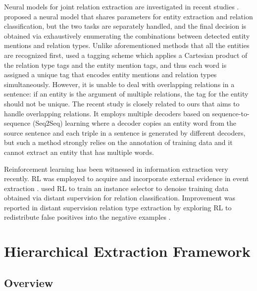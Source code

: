 \documentclass[letterpaper]{article} \usepackage{aaai19}  \usepackage{times}  \usepackage{helvet}  \usepackage{courier}  \usepackage{url}  \usepackage{graphicx}  \frenchspacing  \setlength{\pdfpagewidth}{8.5in}  \setlength{\pdfpageheight}{11in}  \usepackage{amsfonts}
\theoremstyle{definition}
\begin{document}
Neural models for joint relation extraction are investigated in recent studies \cite{katiyar2016investigating,zhang2017end}. \citeauthor{miwa2016end}  proposed a neural model that shares parameters for entity extraction and relation classification, but the two tasks are separately handled, and the final decision is obtained via exhaustively enumerating the combinations between detected entity mentions and relation types. Unlike aforementioned methods that all the entities are recognized first, \citeauthor{zheng2017joint}  used a tagging scheme which applies a Cartesian product of the relation type tags and the entity mention tags, and thus each word is assigned a unique tag that encodes entity mentions and relation types simultaneously. However, it is unable to deal with overlapping relations in a sentence: if an entity is the argument of multiple relations, the tag for the entity should not be unique.  
The recent study \cite{zeng2018extracting} is closely related to ours that aims to handle overlapping relations. It employs multiple decoders based on sequence-to-sequence (Seq2Seq) learning where a decoder copies an entity word from the source sentence and each triple in a sentence is generated by different decoders, but such a method strongly relies on the annotation of training data and it cannot extract an entity that has multiple words.

Reinforcement learning has been witnessed in information extraction very recently. RL was employed to acquire and incorporate external evidence in event extraction \cite{narasimhan2016improving}. \citeauthor{feng2018reinforcement}  used RL to train an instance selector to denoise training data obtained via distant supervision for relation classification. 
Improvement was reported in distant supervision relation type extraction by exploring RL to redistribute false positives into the negative examples \cite{qin2018robust}.


\section{Hierarchical Extraction Framework}
 


\subsection{Overview}
\end{document}
